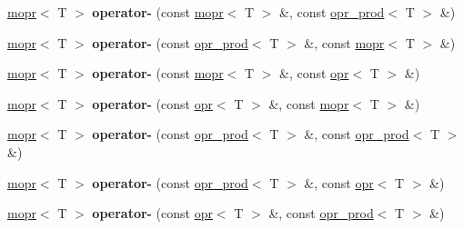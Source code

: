 \begin{DoxyCompactItemize}
\mbox{\label{classqbasis_1_1mopr_a214014c4baf9a15d123b3182155a7b7c}} 
\hyperlink{classqbasis_1_1mopr}{mopr}$<$ T $>$ {\bfseries operator-\/} (const \hyperlink{classqbasis_1_1mopr}{mopr}$<$ T $>$ \&, const \hyperlink{classqbasis_1_1opr__prod}{opr\+\_\+prod}$<$ T $>$ \&)
\item 
\mbox{\label{classqbasis_1_1mopr_a4060621957b95e5902436bbe0653bf03}} 
\hyperlink{classqbasis_1_1mopr}{mopr}$<$ T $>$ {\bfseries operator-\/} (const \hyperlink{classqbasis_1_1opr__prod}{opr\+\_\+prod}$<$ T $>$ \&, const \hyperlink{classqbasis_1_1mopr}{mopr}$<$ T $>$ \&)
\item 
\mbox{\label{classqbasis_1_1mopr_a29820d310499460cda4f8e01fbe4c651}} 
\hyperlink{classqbasis_1_1mopr}{mopr}$<$ T $>$ {\bfseries operator-\/} (const \hyperlink{classqbasis_1_1mopr}{mopr}$<$ T $>$ \&, const \hyperlink{classqbasis_1_1opr}{opr}$<$ T $>$ \&)
\item 
\mbox{\label{classqbasis_1_1mopr_a243c3c360fb14971561be7ffa7937e84}} 
\hyperlink{classqbasis_1_1mopr}{mopr}$<$ T $>$ {\bfseries operator-\/} (const \hyperlink{classqbasis_1_1opr}{opr}$<$ T $>$ \&, const \hyperlink{classqbasis_1_1mopr}{mopr}$<$ T $>$ \&)
\item 
\mbox{\label{classqbasis_1_1mopr_a5d2ea33becf63d9c1c8a70ccf032e02f}} 
\hyperlink{classqbasis_1_1mopr}{mopr}$<$ T $>$ {\bfseries operator-\/} (const \hyperlink{classqbasis_1_1opr__prod}{opr\+\_\+prod}$<$ T $>$ \&, const \hyperlink{classqbasis_1_1opr__prod}{opr\+\_\+prod}$<$ T $>$ \&)
\item 
\mbox{\label{classqbasis_1_1mopr_a10bb677cc19276cf0d759172083f14c8}} 
\hyperlink{classqbasis_1_1mopr}{mopr}$<$ T $>$ {\bfseries operator-\/} (const \hyperlink{classqbasis_1_1opr__prod}{opr\+\_\+prod}$<$ T $>$ \&, const \hyperlink{classqbasis_1_1opr}{opr}$<$ T $>$ \&)
\item 
\mbox{\label{classqbasis_1_1mopr_ae175cad3899af450cce73b08749c6734}} 
\hyperlink{classqbasis_1_1mopr}{mopr}$<$ T $>$ {\bfseries operator-\/} (const \hyperlink{classqbasis_1_1opr}{opr}$<$ T $>$ \&, const \hyperlink{classqbasis_1_1opr__prod}{opr\+\_\+prod}$<$ T $>$ \&)

\end{DoxyCompactItemize}
